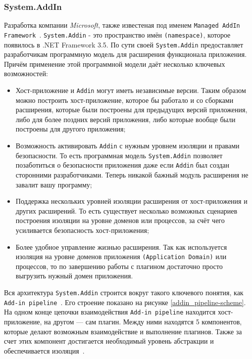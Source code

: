 \subsubsection{System.AddIn}
\label{sec:system_addin}

Разработка компании {\it Microsoft}, также известеная под именем {\tt Managed AddIn Framework}~\cite{System.Addins-article, maf}. {\tt System.Addin} - это пространство имён {\tt(namespace)}, которое появилось в .NET Framework 3.5. По сути своей {\tt System.Addin} предоставляет разработчикам программную модель для расширения функционала приложения. Причём применение этой программной модели даёт несколько ключевых возможностей:

\begin{itemize}

  \item Хост-приложение и {\tt Addin} могут иметь независимые версии. Таким образом можно построить хост-приложение, которое бы работало и со сборками расширения, которые были построены для предыдущих версий приложения, либо для более поздних версий приложения, либо которые вообще были построены для другого приложения;

  \item Возможность активировать {\tt Addin} с нужным уровнем изоляции и правами безопасности. То есть программная модель {\tt System.Addin} позволяет позаботиться о безопасности приложения даже если {\tt Addin} был создан сторонними разработчиками. Теперь никакой бажный модуль расширения не завалит вашу программу;

  \item Поддержка нескольких уровней изоляции расширения от хост-приложения и других расширений. То есть существует несколько возможных сценариев построения изоляции на уровне доменов или процессов, за счёт чего усиливается безопасность хост-приложения;

  \item Более удобное управление жизнью расширения. Так как используется изоляция на уровне доменов приложения {\tt (Application Domain)} или процессов, то по завершению работы с плагином достаточно просто выгрузить нужный домен приложения.

\end{itemize}

Вся архитектура {\tt System.Addin} строится вокруг такого ключевого понятия, как {\tt Add-in pipeline}~\cite{addins1-article}. Его строение показано на рисунке \ref{addin_pipeline-scheme}. На одном конце цепочки взаимодействия {\tt Add-in pipeline} находится хост-приложение, на другом --- сам плагин. Между ними находятся 5 компонентов, которые делают возможным взаимодействие и выполнение плагинов. Также за счет этих компонент достигается необходимый уровень абстракции и обеспечивается изоляция~\cite{use-systemaddin-namespace}.

